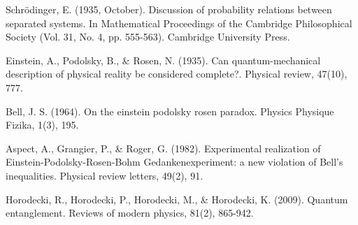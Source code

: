 \documentclass[a4paper, 12pt,oneside]{article}
\begin{document}
\begin{thebibliography}{99}

    Schrödinger, E. (1935, October). Discussion of probability relations between separated systems. In Mathematical Proceedings of the Cambridge Philosophical Society (Vol. 31, No. 4, pp. 555-563). Cambridge University Press.
    
    Einstein, A., Podolsky, B., \& Rosen, N. (1935). Can quantum-mechanical description of physical reality be considered complete?. Physical review, 47(10), 777.
    
    Bell, J. S. (1964). On the einstein podolsky rosen paradox. Physics Physique Fizika, 1(3), 195.

    Aspect, A., Grangier, P., \& Roger, G. (1982). Experimental realization of Einstein-Podolsky-Rosen-Bohm Gedankenexperiment: a new violation of Bell's inequalities. Physical review letters, 49(2), 91.

    Horodecki, R., Horodecki, P., Horodecki, M., \& Horodecki, K. (2009). Quantum entanglement. Reviews of modern physics, 81(2), 865-942.
    
    
\end{thebibliography}
\end{document}
